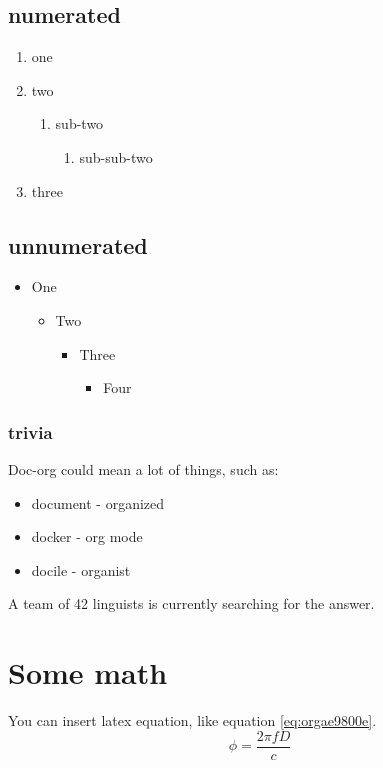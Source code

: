 \subsection{numerated}
\label{sec:orgb4b9e42}
\begin{enumerate}
\item one
\item two
\begin{enumerate}
\item sub-two
\begin{enumerate}
\item sub-sub-two
\end{enumerate}
\end{enumerate}
\item three
\end{enumerate}

\subsection{unnumerated}
\label{sec:orgad4dbd0}
\begin{itemize}
\item One
\begin{itemize}
\item Two
\begin{itemize}
\item Three
\begin{itemize}
\item Four
\end{itemize}
\end{itemize}
\end{itemize}
\end{itemize}

\subsubsection{trivia}
\label{sec:org3466095}
Doc-org could mean a lot of things, such as:
\begin{itemize}
\item document - organized
\item docker - org mode
\item docile - organist
\end{itemize}
A team of 42 linguists is currently searching for the answer.

\section{Some math}
\label{sec:org6033f9d}
You can insert latex equation, like equation \ref{eq:orgae9800e}.
\begin{equation}
\label{eq:orgae9800e}
\phi = \frac{2\pi fD}{c}
\end{equation}

